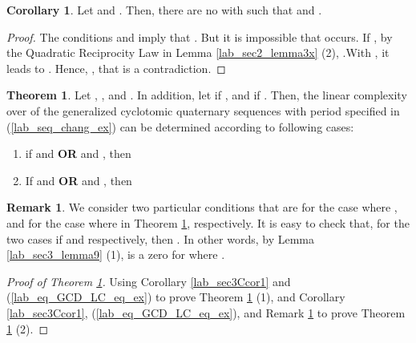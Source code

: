\documentclass{mcom-l}
\theoremstyle{definition}
\newtheorem{sec3Cremark1}[sec3_remark1]{Remark}
\newtheorem{sec3CThm01}[sec3thm1]{Theorem}
\newtheorem{sec3Ccor5}[sec3Bcor1]{Corollary}
\numberwithin{equation}{section}
\begin{document}
     \begin{sec3Ccor5}\label{lab_sec3Ccor5}
     Let  and . Then, there are no  with  such that  and .
     \end{sec3Ccor5}
     \begin{proof}
     The conditions  and  imply that . But it is impossible that  occurs. If , by the Quadratic Reciprocity Law in Lemma \ref{lab_sec2_lemma3x} (2), .With  , it leads to . Hence, , that is a contradiction.    
     \end{proof} 
     \begin{sec3CThm01}\label{lab_sec3CThm01}
    Let , ,  and . In addition, let   if , and  if .
    Then, the linear complexity over  of the generalized cyclotomic quaternary sequences with period  specified in (\ref{lab_seq_chang_ex}) can be determined according to following cases:
     \begin{enumerate} \item if  and  \textbf{OR}  and  , then
     
    
      \item If  and  \textbf{OR}  and , then
     
      \end{enumerate}
     \end{sec3CThm01}
     \begin{sec3Cremark1}\label{Lab_sec3Cremark1}
     We consider two particular conditions that are  for the case where , and  for the case where  in Theorem \ref{lab_sec3CThm01}, respectively. It is easy to check that, for the two cases if   and  respectively, then . In other words, by Lemma \ref{lab_sec3_lemma9} (1),  is a zero for  where .
     \end{sec3Cremark1}
     \begin{proof}[Proof of Theorem \ref{lab_sec3CThm01}]
     Using Corollary \ref{lab_sec3Ccor1} and (\ref{lab_eq_GCD_LC_eq_ex}) to prove Theorem \ref{lab_sec3CThm01} (1), and  Corollary \ref{lab_sec3Ccor1}, (\ref{lab_eq_GCD_LC_eq_ex}), and Remark \ref{Lab_sec3Cremark1} to prove Theorem \ref{lab_sec3CThm01} (2).
     \end{proof}
      
\end{document}
